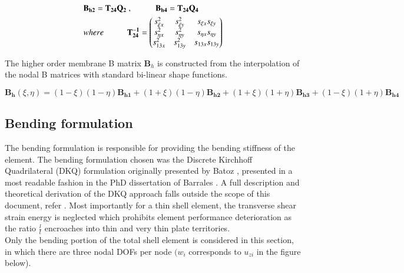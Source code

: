 \begin{gather} 
	\begin{aligned}
		&\mathbf{B_{h2}} = \mathbf{T_{24}}  \mathbf{Q_{2}}\ ,
		\hspace{10mm}
		\mathbf{B_{h4}} = \mathbf{T_{24}}  \mathbf{Q_{4}}\\
		&where 
		\hspace{10mm} 
		\mathbf{T_{24}^{-1}} =
		\begin{pmatrix}
			s_{\xi x}^2 & s_{\xi y}^2 & s_{\xi x} s_{\xi y} \\
			s_{\eta x}^2 & s_{\eta y}^2 & s_{\eta x} s_{\eta y} \\
			s_{13 x}^2 & s_{13 y}^2 & s_{13 x} s_{13 y}
		\end{pmatrix}
		\label{equation18}
	\end{aligned}
\end{gather}

The higher order membrane B matrix $\mathbf{B}_h$ is constructed from the interpolation of the nodal B matrices with standard bi-linear shape functions.

\begin{equation} 
\mathbf{B_h}(\xi,\eta) = (1-\xi)(1-\eta)\mathbf{B_{h1}} + (1+\xi)(1-\eta)\mathbf{B_{h2}} + (1+\xi)(1+\eta)\mathbf{B_{h3}} +	(1-\xi)(1+\eta)\mathbf{B_{h4}} 
\label{equation19}
\end{equation}


\subsection{Bending formulation}

The bending formulation is responsible for providing the bending stiffness of the element. The bending formulation chosen was the Discrete Kirchhoff Quadrilateral (DKQ) formulation  originally presented by Batoz \cite{Bat82}, presented in a most readable fashion in the PhD dissertation of Barrales \cite{Bar12}. A full description and theoretical derivation of the DKQ approach falls outside the scope of this document, refer \cite{Bat82}. Most importantly for a thin shell element, the transverse shear strain energy is neglected which prohibits element performance deterioration as the ratio $\frac{l}{t}$ encroaches into thin and very thin plate territories.\\

Only the bending portion of the total shell element is considered in this section, in which there are three nodal DOFs per node $(w_i$ corresponds to $u_{zi}$ in the figure below).

